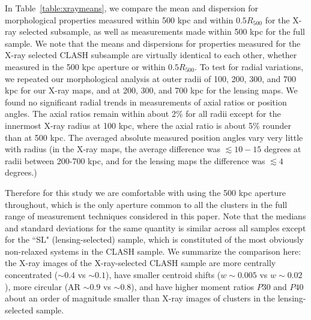 \documentclass[iop,twocolumn]{emulateapj}
\begin{document}
{In Table~\ref{table:xraymeans}, we compare the mean and dispersion for morphological properties measured within 500 kpc
and within $0.5 R_{500}$ for the X-ray selected subsample, as well as measurements made within 500 kpc for the full
sample. We note that the means and dispersions for properties measured for the X-ray selected CLASH subsample
are virtually identical to each other, whether measured in the 500 kpc aperture or within $0.5 R_{500}$. 
 To test for radial variations, we repeated our morphological analysis at outer radii of 100, 200, 300, and 700 kpc for our X-ray maps, and at
200, 300, and 700 kpc for the lensing maps. We found no significant radial trends in measurements of axial ratios
or position angles. The axial ratios remain within about 2\% for all radii except for the innermost X-ray radius at 100 kpc,
where the axial ratio is about 5\% rounder than at 500 kpc. The averaged absolute 
measured position angles vary very little with radius (in the X-ray maps, the average difference was 
$\lesssim 10-15$ degrees at radii between 200-700 kpc, and for the lensing maps the difference was $\lesssim 4$ degrees.)

Therefore for this study we are comfortable with using the 500 kpc aperture throughout, which is the only aperture common to all
the clusters in the full range of measurement techniques considered in this paper. Note that the medians 
and standard deviations for the same quantity is similar across all samples except for the ``SL" (lensing-selected) sample, which 
is constituted of the most obviously non-relaxed systems in the CLASH sample. We summarize the comparison here:   
the X-ray images of the X-ray-selected CLASH sample are
more centrally concentrated ($\sim 0.4$ vs $\sim 0.1$), have smaller centroid shifts ($w \sim 0.005$ vs $w \sim 0.02$),
more circular (AR $\sim 0.9$ vs $\sim 0.8$), and have higher moment ratios $P30$ and $P40$ about an order of magnitude
smaller than X-ray images of clusters in the lensing-selected sample.

}
\end{document}

